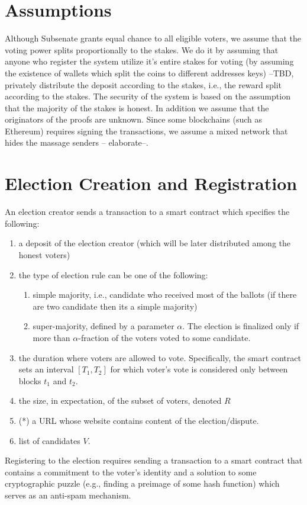 \documentclass[]{paper}
\begin{document}
\section{Assumptions}
Although Subsenate grants equal chance to all eligible voters, we assume that the voting power splits proportionally to the stakes. We do it by assuming that anyone who register the system utilize it's entire stakes for voting (by assuming the existence of wallets which split the coins to different addresses keys)  --TBD, privately distribute the deposit according to the stakes, i.e., the reward split according to the stakes.
The security of the system is based on the assumption that the majority of the stakes is honest. 
In addition we assume that the originators of the proofs are unknown. Since some blockchains (such as Ethereum) requires signing the transactions, we assume a mixed network that hides the massage senders -- elaborate--.

\section{Election Creation and Registration}
An election creator sends a transaction to a smart contract which specifies the following:
\begin{enumerate}
	\item a deposit of the election creator (which will be later distributed among the honest voters)
	\item the type of election rule can be one of the following: 
	\begin{enumerate}
		\item simple majority, i.e., candidate who received most of the ballots (if there are two candidate then its a simple majority)
		\item  super-majority, defined by a parameter $\alpha$. The election is finalized only if  more than $\alpha$-fraction of the voters voted to some candidate.
	\end{enumerate}
	\item the duration where voters are allowed to vote. Specifically, the smart contract sets an interval $[T_1,T_2]$ for which voter's vote is considered only between blocks $t_1$ and $t_2$.  
	\item the size, in expectation, of the subset of voters, denoted $R$ 
	\item (*) a URL whose website contains content of the election/dispute. 
	\item list of candidates $V$.
\end{enumerate}
Registering to the election requires sending a transaction to a smart contract that contains a commitment to the voter's identity and a solution to some cryptographic puzzle (e.g., finding a preimage of some hash function) which serves as an anti-spam mechanism. 
				
\end{document}

